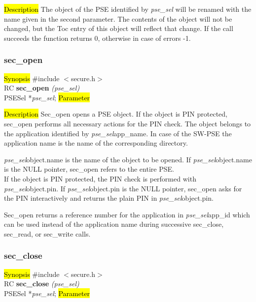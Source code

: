\hl{Description}
The object of the PSE identified by {\em pse\_sel} will be renamed
with the name given in the second parameter. The contents of the
object will not be changed, but the Toc entry of this object
will reflect that change. If the call succeeds the function
returns 0, otherwise in case of errors -1.

\subsubsection{sec\_open}
\label{sec_open}
\hl{Synopsis}
\#include $<$secure.h$>$ \\ [0.5cm]
RC {\bf sec\_open} {\em (pse\_sel)} \\
PSESel *{\em pse\_sel};
\hl{Parameter}

\hl{Description}
Sec\_open opens a PSE object. If the object is PIN protected, sec\_open performs
all necessary actions for the PIN check.
The object belongs to the application identified by {\em pse\_sel}\pf app\_name.
In case of the SW-PSE the application name is the name of the corresponding directory. 

{\em pse\_sel}\pf object.name is the name of the object to be opened. If {\em pse\_sel}\pf object.name
is the NULL pointer, sec\_open refers to the entire PSE. \\
If the object is PIN protected, the PIN check is performed with {\em pse\_sel}\pf object.pin.
If {\em pse\_sel}\pf object.pin is the NULL pointer, sec\_open asks for the PIN
interactively and returns the plain PIN in {\em pse\_sel}\pf object.pin. 

Sec\_open returns a reference number for the application in {\em pse\_sel}\pf app\_id which
can be used instead of the application name during successive sec\_close, sec\_read, 
or sec\_write calls.

\subsubsection{sec\_close}
\label{sec_close}
\hl{Synopsis}
\#include $<$secure.h$>$ \\ [0.5cm]
RC {\bf sec\_close} {\em (pse\_sel)} \\
PSESel *{\em pse\_sel};
\hl{Parameter}

